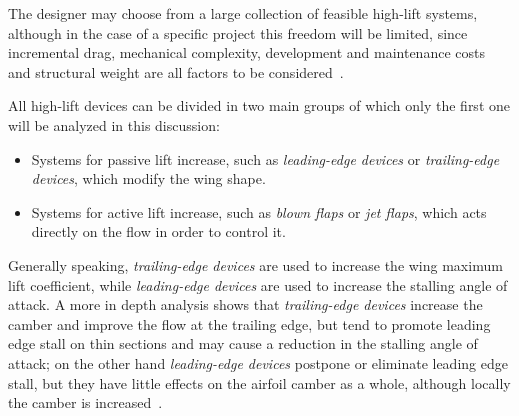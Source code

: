\bigskip
\noindent
The designer may choose from a large collection of feasible high-lift systems, although in the case of a specific project this freedom will be limited, since incremental drag, mechanical complexity, development and maintenance costs and structural weight are all factors to be considered~\cite{torenbeek1982synthesis}.

\bigskip
\noindent
All high-lift devices can be divided in two main groups of which only the first one will be analyzed in this discussion:
%
\begin{itemize}
\item Systems for passive lift increase, such as \emph{leading-edge devices} or \emph{trailing-edge devices}, which modify the wing shape.
\item Systems for active lift increase, such as \emph{blown flaps} or \emph{jet flaps}, which acts directly on the flow in order to control it.
\end{itemize}
%
\noindent
Generally speaking, \emph{trailing-edge devices} are used to increase the wing maximum lift coefficient, while \emph{leading-edge devices} are used to increase the stalling angle of attack. 
%
A more in depth analysis shows that \emph{trailing-edge devices} increase the camber and improve the flow at the trailing edge, but tend to promote leading edge stall on thin sections and may cause a reduction in the stalling angle of attack; on the other hand \emph{leading-edge devices} postpone or eliminate leading edge stall, but  they have little effects on the airfoil camber as a whole, although locally the camber is increased~\cite{torenbeek1982synthesis}.

